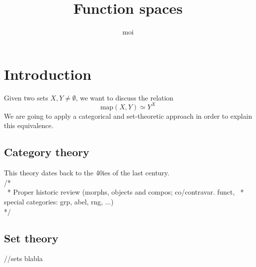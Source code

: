 \documentclass[10pt,a4paper]{article}
\author{moi}
\title{Function spaces}
\begin{document}
\section{Introduction}
Given two sets $X, Y \neq \emptyset$, we want to discuss the relation
$$\mathrm{map}(X, Y) \simeq Y^X$$
We are going to apply a categorical and set-theoretic approach in order to explain this equivalence.
\subsection{Category theory}
This theory dates back to the 40ies of the last century.\\
/*\\
 ~* Proper historic review (morphs, objects and compos; co/contravar. funct, ~* special categories: grp, abel, rng, ...)\\
 */
\subsection{Set theory}
//sets blabla
\newpage
\end{document}
